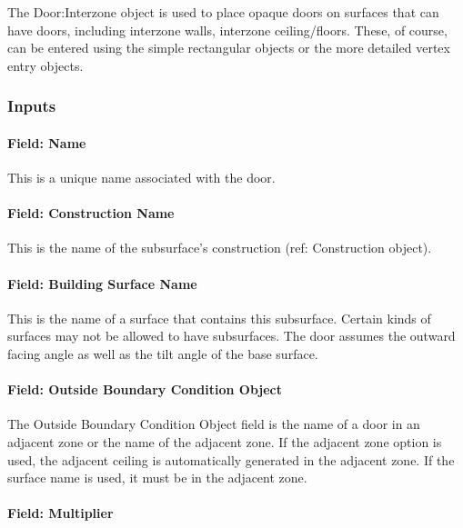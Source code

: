 The Door:Interzone object is used to place opaque doors on surfaces that can have doors, including interzone walls, interzone ceiling/floors. These, of course, can be entered using the simple rectangular objects or the more detailed vertex entry objects.

\subsubsection{Inputs}\label{inputs-18-010}

\paragraph{Field: Name}\label{field-name-14-010}

This is a unique name associated with the door.

\paragraph{Field: Construction Name}\label{field-construction-name-14}

This is the name of the subsurface's construction (ref: Construction object).

\paragraph{Field: Building Surface Name}\label{field-building-surface-name-4}

This is the name of a surface that contains this subsurface. Certain kinds of surfaces may not be allowed to have subsurfaces. The door assumes the outward facing angle as well as the tilt angle of the base surface.

\paragraph{Field: Outside Boundary Condition Object}\label{field-outside-boundary-condition-object-4}

The Outside Boundary Condition Object field is the name of a door in an adjacent zone or the name of the adjacent zone. If the adjacent zone option is used, the adjacent ceiling is automatically generated in the adjacent zone. If the surface name is used, it must be in the adjacent zone.

\paragraph{Field: Multiplier}\label{field-multiplier-5}

